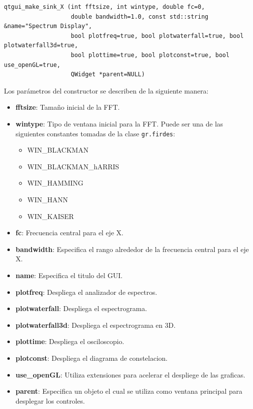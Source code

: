 \begin{lstlisting}[float, label=ex:qtguiconst, caption={Constructor de los bloques qtgui\_sink\_x},
breaklines=true, language={[ISO]C++}]
qtgui_make_sink_X (int fftsize, int wintype, double fc=0, 
                   double bandwidth=1.0, const std::string &name="Spectrum Display",
                   bool plotfreq=true, bool plotwaterfall=true, bool plotwaterfall3d=true,
                   bool plottime=true, bool plotconst=true, bool use_openGL=true,
                   QWidget *parent=NULL)
\end{lstlisting}

Los par\'ametros del constructor se describen de la siguiente manera:

\begin{itemize}
  \item \textbf{fftsize}: Tama\~no inicial de la FFT.
  \item \textbf{wintype}: Tipo de ventana inicial para la FFT. Puede ser una de las siguientes
  constantes tomadas de la clase \verb|gr.firdes|:
  \begin{itemize}
    \item WIN\_BLACKMAN 
    \item WIN\_BLACKMAN\_hARRIS
    \item WIN\_HAMMING
    \item WIN\_HANN 
    \item WIN\_KAISER
  \end{itemize}
  \item \textbf{fc}: Frecuencia central para el eje X.
  \item \textbf{bandwidth}: Especifica el rango alrededor de la frecuencia central para el eje X.
  \item \textbf{name}: Especifica el titulo del GUI.
  \item \textbf{plotfreq}: Despliega el analizador de espectros.
  \item \textbf{plotwaterfall}: Despliega el espectrograma.
  \item \textbf{plotwaterfall3d}: Despliega el espectrograma en 3D.
  \item \textbf{plottime}: Despliega el osciloscopio.
  \item \textbf{plotconst}: Despliega el diagrama de constelacion.
  \item \textbf{use\_openGL}: Utiliza extensiones para acelerar el despliege de las graficas.
  \item \textbf{parent}: Especifica un objeto el cual se utiliza como ventana principal para
  desplegar los controles.
\end{itemize}

